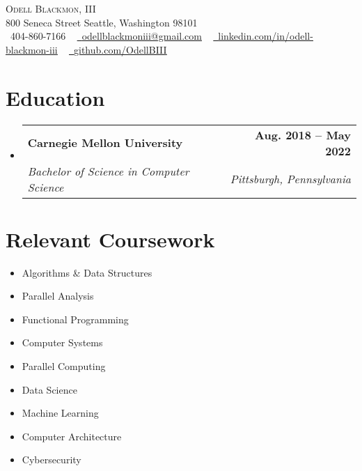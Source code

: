 \documentclass[letterpaper,11pt]{article}
\makeatletter
\newcommand{\resumeSubheading}[4]{
  \vspace{-2pt}\item
    \begin{tabular*}{1.0\textwidth}[t]{l@{\extracolsep{\fill}}r}
      \textbf{#1} & \textbf{\small #2} \\
      \textit{\small#3} & \textit{\small #4} \\
    \end{tabular*}\vspace{-7pt}
}
\newcommand{\resumeSubHeadingListStart}{\begin{itemize}[leftmargin=0.0in, label={}]}
\newcommand{\resumeSubHeadingListEnd}{\end{itemize}}
\makeatother
\begin{document}

\begin{center}
    {\Huge \scshape Odell Blackmon, III} \\ \vspace{1pt}
    800 Seneca Street Seattle, Washington 98101 \\ \vspace{1pt}
    \small \raisebox{-0.1\height}\faPhone\ 404-860-7166 ~ \href{mailto:odellblackmoniii@gmail.com}{\raisebox{-0.2\height}\faEnvelope\  \underline{odellblackmoniii@gmail.com}} ~ 
    \href{https://linkedin.com/in/odell-blackmon-iii}{\raisebox{-0.2\height}\faLinkedin\ \underline{linkedin.com/in/odell-blackmon-iii}}  ~
    \href{https://github.com/OdellBIII}{\raisebox{-0.2\height}\faGithub\ \underline{github.com/OdellBIII}}
    \vspace{-8pt}
\end{center}


\section{Education}
  \resumeSubHeadingListStart
    \resumeSubheading
      {Carnegie Mellon University}{Aug. 2018 -- May 2022}
      {Bachelor of Science in Computer Science}{Pittsburgh, Pennsylvania}
  \resumeSubHeadingListEnd

\section{Relevant Coursework}
        \begin{multicols}{3}
            \begin{itemize}[itemsep=-5pt, parsep=3pt]
                \item\small Algorithms \& Data Structures
                \item Parallel Analysis
                \item Functional Programming
                \item Computer Systems
                \item Parallel Computing
                \item Data Science
                \item Machine Learning
                \item Computer Architecture
                \item Cybersecurity
            \end{itemize}
        \end{multicols}
        \vspace*{2.0\multicolsep}
\end{document}
